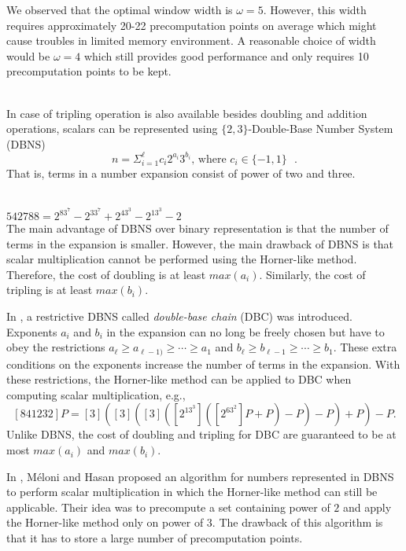 We observed that the optimal window width is $\omega = 5$.
However, this width requires approximately 20-22 precomputation points on average
which might cause troubles in limited memory environment.
A reasonable choice of width would be $\omega = 4$ which still provides good performance
and only requires 10 precomputation points to be kept.



 \\
\label{sec:dbns}
In case of tripling operation is also available besides doubling and addition operations,
scalars can be represented using $\{2,3\}$-Double-Base Number System (DBNS)
$$n = \Sigma^{\ell}_{i=1} c_i 2^{a_i}3^{b_i} \text{, where $c_i \in \{-1,1\}$ }.$$
That is, terms in a number expansion consist of power of two and three.

 \\
$542788 = 2^83^7 - 2^33^7 + 2^43^3 - 2^13^3 - 2$
\\

The main advantage of DBNS over binary representation is that the number of terms in the expansion is smaller.
However, the main drawback of DBNS is that scalar multiplication cannot be performed using the Horner-like method.
Therefore, the cost of doubling is at least $max(a_i)$.  Similarly, the cost of tripling is at least $max(b_i)$.

In \cite{DIM05}, a restrictive DBNS called {\it{double-base chain}} (DBC) was introduced.
Exponents $a_i$ and $b_i$ in the expansion can no long be freely chosen but have to obey the restrictions
$a_\ell \ge a_{\ell-1)} \ge \cdots \ge a_1$ and $b_\ell \ge b_{\ell-1} \ge \cdots \ge b_1$.
These extra conditions on the exponents increase the number of terms in the expansion.
With these restrictions, the Horner-like method can be applied to DBC when computing scalar multiplication, e.g.,
$$[841232]P = [3]([3]([3]([2^13^3]([2^63^2]P+P)-P)-P)+P)-P.$$
Unlike DBNS, the cost of doubling and tripling for DBC are guaranteed to be at most $max(a_i)$ and $max(b_i)$.

In \cite{MH09}, M\'eloni and Hasan proposed an algorithm for numbers represented in DBNS to perform scalar multiplication
in which the Horner-like method can still be applicable.
Their idea was to precompute a set containing power of $2$ and apply the Horner-like method only on power of $3$.
The drawback of this algorithm is that it has to store a large number of precomputation points.

